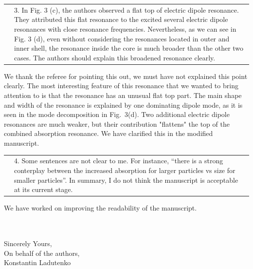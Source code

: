 \documentclass[a4paper]{article}
\begin{document}
\begin{tabular}[!H]{l|p{}}
\quad & 3.      In Fig. 3 (c), the authors observed a flat top of
electric dipole resonance. They attributed this flat resonance to the
excited several electric dipole resonances with close resonance
frequencies. Nevertheless, as we can see in Fig. 3 (d), even without
considering the resonances located in outer and inner shell, the
resonance inside the core is much broader than the other two
cases. The authors should explain this broadened resonance clearly. 
\end{tabular}

We thank the referee for pointing this out, we must have not explained this point clearly. The most interesting feature of this resonance that we wanted to bring attention to is that the resonance has an unusual flat top part. The main shape and width of the resonance is explained by one dominating dipole mode, as it is seen in the mode decomposition in Fig.~3(d). Two additional electric dipole resonances are much weaker, but their contribution "flattens" the top of the combined absorption resonance. We have clarified this in the modified manuscript.


\begin{tabular}[!H]{l|p{}}
\quad & 4.      Some sentences are not clear to me. For instance,
“there is a strong conterplay between the increased absorption for
larger particles vs size for smaller particles”. 
In summary, I do not think the manuscript is acceptable at its current
stage. 
\end{tabular}%

We have worked on improving the readability of the manuscript.

\\
\vspace{10pt}
\\
Sincerely Yours,\\
On behalf of the authors,\\
Konstantin Ladutenko
\end{document}
